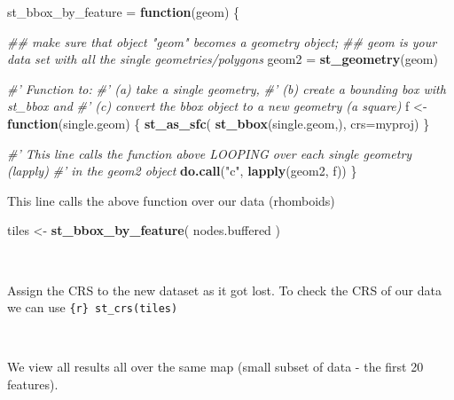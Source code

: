\documentclass[]{article}
\newenvironment{Shaded}{\begin{snugshade}}{\end{snugshade}}
\newcommand{\CommentTok}[1]{\textcolor[rgb]{0.56,0.35,0.01}{\textit{#1}}}
\newcommand{\ControlFlowTok}[1]{\textcolor[rgb]{0.13,0.29,0.53}{\textbf{#1}}}
\newcommand{\DataTypeTok}[1]{\textcolor[rgb]{0.13,0.29,0.53}{#1}}
\newcommand{\KeywordTok}[1]{\textcolor[rgb]{0.13,0.29,0.53}{\textbf{#1}}}
\newcommand{\NormalTok}[1]{#1}
\newcommand{\OperatorTok}[1]{\textcolor[rgb]{0.81,0.36,0.00}{\textbf{#1}}}
\newcommand{\StringTok}[1]{\textcolor[rgb]{0.31,0.60,0.02}{#1}}
\begin{document}
\begin{Shaded}
\begin{Highlighting}[]
\NormalTok{st_bbox_by_feature =}\StringTok{ }\ControlFlowTok{function}\NormalTok{(geom) \{}
  
  \CommentTok{## make sure that object "geom" becomes a geometry object;}
  \CommentTok{## geom is your data set with all the single geometries/polygons}
\NormalTok{  geom2 =}\StringTok{ }\KeywordTok{st_geometry}\NormalTok{(geom)}
  
  \CommentTok{#' Function to:}
  \CommentTok{#' (a) take a single geometry, }
  \CommentTok{#' (b) create a bounding box with st_bbox and }
  \CommentTok{#' (c) convert the bbox object to a new geometry (a square)}
\NormalTok{  f <-}\StringTok{ }\ControlFlowTok{function}\NormalTok{(single.geom) \{ }
    \KeywordTok{st_as_sfc}\NormalTok{( }\KeywordTok{st_bbox}\NormalTok{(single.geom,), }\DataTypeTok{crs=}\NormalTok{myproj)}
\NormalTok{  \}}
  
  \CommentTok{#' This line calls the function above LOOPING over each single geometry (lapply)}
  \CommentTok{#'  in the geom2 object }
  \KeywordTok{do.call}\NormalTok{(}\StringTok{"c"}\NormalTok{, }\KeywordTok{lapply}\NormalTok{(geom2, f))}
\NormalTok{\}}
\end{Highlighting}
\end{Shaded}

This line calls the above function over our data (rhomboids)

\begin{Shaded}
\begin{Highlighting}[]
\NormalTok{tiles <-}\StringTok{ }\KeywordTok{st_bbox_by_feature}\NormalTok{( nodes.buffered )}
\end{Highlighting}
\end{Shaded}

~

Assign the CRS to the new dataset as it got lost. To check the CRS of
our data we can use \texttt{\{r\}\ st\_crs(tiles)}

\begin{Shaded}
\end{Shaded}

~

We view all results all over the same map (small subset of data - the
first 20 features).
\end{document}

